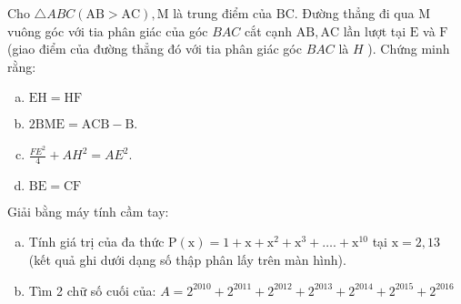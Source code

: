 \begin{bt}
    Cho $\triangle A B C(\mathrm{AB}>\mathrm{AC}), \mathrm{M}$ là trung điểm của $\mathrm{BC}$. Đường thẳng đi qua $\mathrm{M}$ vuông góc với tia phân giác của góc $B A C$ cắt cạnh $\mathrm{AB}, \mathrm{AC}$ lần lượt tại $\mathrm{E}$ và $\mathrm{F}$ (giao điểm của đường thẳng đó với tia phân giác góc $BAC$ là $H$ ). Chứng minh rằng:
    \begin{enumerate}[a.]
        \item $\mathrm{EH}=\mathrm{HF}$
        \item $2 \mathrm{BME}=\mathrm{ACB}-\mathrm{B}$.
        \item $\frac{F E^2}{4}+A H^2=A E^2$.
        \item $\mathrm{BE}=\mathrm{CF}$
    \end{enumerate}
	\loigiai{}
\end{bt}

\begin{bt}
   Giải bằng máy tính cầm tay:
   \begin{enumerate}[a.]
    \item Tính giá trị của đa thức $\mathrm{P}(\mathrm{x})=1+\mathrm{x}+\mathrm{x}^2+\mathrm{x}^3+\ldots .+\mathrm{x}^{10}$ tại $\mathrm{x}=2,13$ (kết quả ghi dưới dạng số thập phân lấy trên màn hình).
    \item Tìm 2 chữ số cuối của: $A=2^{2010}+2^{2011}+2^{2012}+2^{2013}+2^{2014}+2^{2015}+2^{2016}$
   \end{enumerate}
\loigiai{}
\end{bt}


